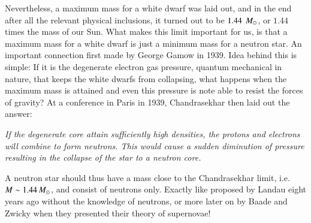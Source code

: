 

Nevertheless, a maximum mass for a white dwarf was laid out, and in the end after all the relevant physical inclusions, it turned out to be $1.44~\, M_{\odot}$, or $1.44$ times the mass of our Sun.
What makes this limit important for us, is that a maximum mass for a white dwarf is just a minimum mass for a neutron star.
An important connection first made by George Gamow in 1939\cite{Gamow39}.
Idea behind this is simple: 
If it is the degenerate electron gas pressure, quantum mechanical in nature, that keeps the white dwarfs from collapsing, what happens when the maximum mass is attained and even this pressure is note able to resist the forces of gravity?
At a conference in Paris in 1939, Chandrasekhar then laid out the answer:
\begin{displayquote}
    \textit{
    If the degenerate core attain sufficiently high densities, the protons and electrons will combine to form neutrons. 
    This would cause a sudden diminution of pressure resulting in the collapse of the star to a neutron core.
    }
\end{displayquote}
A neutron star should thus have a mass close to the Chandrasekhar limit, i.e. $M \sim 1.44\, M_{\odot}$, and consist of neutrons only.
Exactly like proposed by Landau eight years ago without the knowledge of neutrons, or more later on by Baade and Zwicky when they presented their theory of supernovae!




